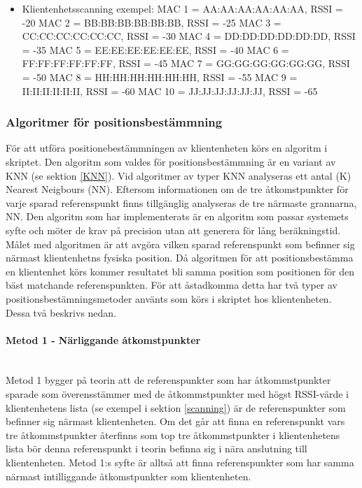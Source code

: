 \documentclass[swedish, a4paper,12pt]{article}
\begin{document}
  \begin{itemize}
  \item Klientenhetsscanning exempel:
        \newline MAC 1 = AA:AA:AA:AA:AA:AA,  RSSI = -20
        \newline MAC 2 = BB:BB:BB:BB:BB:BB,  RSSI = -25
        \newline MAC 3 = CC:CC:CC:CC:CC:CC,  RSSI = -30
        \newline MAC 4 = DD:DD:DD:DD:DD:DD,  RSSI = -35
        \newline MAC 5 = EE:EE:EE:EE:EE:EE,  RSSI = -40
        \newline MAC 6 = FF:FF:FF:FF:FF:FF,  RSSI = -45
        \newline MAC 7 = GG:GG:GG:GG:GG:GG,  RSSI = -50
        \newline MAC 8 = HH:HH:HH:HH:HH:HH,  RSSI = -55
        \newline MAC 9 = II:II:II:II:II:II,  RSSI = -60
        \newline MAC 10 = JJ:JJ:JJ:JJ:JJ:JJ,  RSSI = -65
  \end{itemize}

\subsubsection{Algoritmer för positionsbestämmning}
För att utföra positionebestämmningen av klientenheten körs en algoritm i skriptet. Den algoritm som valdes för positionsbestämmning är en variant av KNN (se sektion \ref{KNN}). Vid algoritmer av typer KNN analyseras ett antal (K) Nearest Neigbours (NN). Eftersom informationen om de tre åtkomstpunkter för varje sparad referenspunkt finns tillgänglig analyseras de tre närmaste grannarna, NN. %
Den algoritm som har implementerats är en algoritm som passar systemets syfte och möter de krav på precision utan att generera för lång beräkningstid. Målet med algoritmen är att avgöra vilken sparad referenspunkt som befinner sig närmast klientenhetns fysiska position. Då algoritmen för att positionsbestämma en klientenhet körs kommer resultatet bli samma position som positionen för den bäst matchande referenspunkten. För att åstadkomma detta har två typer av positionsbestämningsmetoder använts som körs i skriptet hos klientenheten. Dessa två beskrivs nedan.

\paragraph{Metod 1 - Närliggande åtkomstpunkter}
\leavevmode\\
Metod 1 bygger på teorin att de referenspunkter som har åtkommstpunkter sparade som överensstämmer med de åtkommstpunkter med högst RSSI-värde i klientenhetens lista (se exempel i sektion \ref{scanning}) är de referenspunkter som befinner sig närmast klientenheten. Om det går att finna en referenspunkt vars tre åtkommstpunkter återfinns som top tre åtkommstpunkter i klientenhetens lista bör denna referenspunkt i teorin befinna sig i nära anslutning till klientenheten.
Metod 1:s syfte är alltså att finna referenspunkter som har samma närmast intilliggande åtkomstpunkter som klientenheten.
\end{document}
